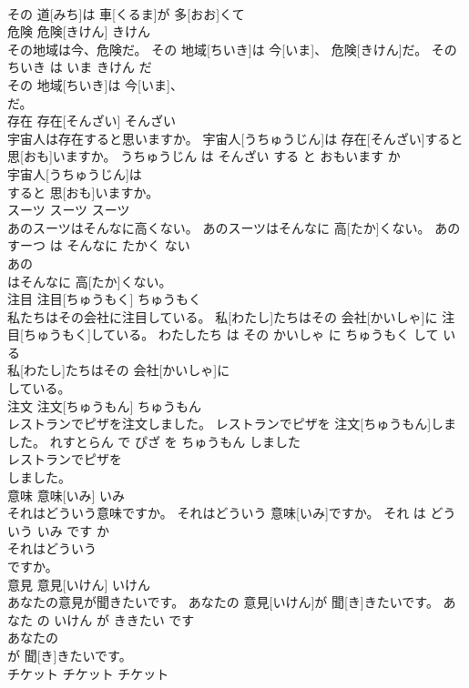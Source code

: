 \documentclass[8pt]{extreport}
\begin{document}
\begin{CJK}{UTF8}{min}
\\	その 道[みち]は 車[くるま]が 多[おお]くて
\\	危険	危険[きけん]	きけん	
\\	その地域は今、危険だ。	その 地域[ちいき]は 今[いま]、 危険[きけん]だ。	その ちいき は いま きけん だ	
\\	その 地域[ちいき]は 今[いま]、
\\	だ。			
\\	存在	存在[そんざい]	そんざい	
\\	宇宙人は存在すると思いますか。	宇宙人[うちゅうじん]は 存在[そんざい]すると 思[おも]いますか。	うちゅうじん は そんざい する と おもいます か	
\\	宇宙人[うちゅうじん]は
\\	すると 思[おも]いますか。			
\\	スーツ	スーツ	スーツ	
\\	あのスーツはそんなに高くない。	あのスーツはそんなに 高[たか]くない。	あの すーつ は そんなに たかく ない	
\\	あの
\\	はそんなに 高[たか]くない。			
\\	注目	注目[ちゅうもく]	ちゅうもく	
\\	私たちはその会社に注目している。	私[わたし]たちはその 会社[かいしゃ]に 注目[ちゅうもく]している。	わたしたち は その かいしゃ に ちゅうもく して いる	
\\	私[わたし]たちはその 会社[かいしゃ]に
\\	している。			
\\	注文	注文[ちゅうもん]	ちゅうもん	
\\	レストランでピザを注文しました。	レストランでピザを 注文[ちゅうもん]しました。	れすとらん で ぴざ を ちゅうもん しました	
\\	レストランでピザを
\\	しました。			
\\	意味	意味[いみ]	いみ	
\\	それはどういう意味ですか。	それはどういう 意味[いみ]ですか。	それ は どういう いみ です か	
\\	それはどういう
\\	ですか。			
\\	意見	意見[いけん]	いけん	
\\	あなたの意見が聞きたいです。	あなたの 意見[いけん]が 聞[き]きたいです。	あなた の いけん が ききたい です	
\\	あなたの
\\	が 聞[き]きたいです。			
\\	チケット	チケット	チケット	

\end{CJK}
\end{document}
